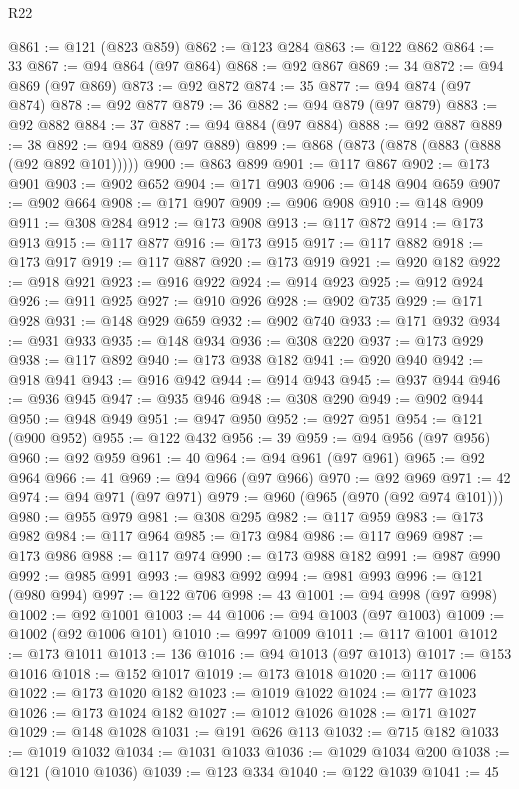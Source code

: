 \begin{lexlean}{R22}
\begin{coremodule}
@861 := @121 (@823 @859)
@862 := @123 @284
@863 := @122 @862
@864 := 33
@867 := @94 @864 (@97 @864)
@868 := @92 @867
@869 := 34
@872 := @94 @869 (@97 @869)
@873 := @92 @872
@874 := 35
@877 := @94 @874 (@97 @874)
@878 := @92 @877
@879 := 36
@882 := @94 @879 (@97 @879)
@883 := @92 @882
@884 := 37
@887 := @94 @884 (@97 @884)
@888 := @92 @887
@889 := 38
@892 := @94 @889 (@97 @889)
@899 := @868 (@873 (@878 (@883 (@888 (@92 @892 @101)))))
@900 := @863 @899
@901 := @117 @867
@902 := @173 @901
@903 := @902 @652
@904 := @171 @903
@906 := @148 @904 @659
@907 := @902 @664
@908 := @171 @907
@909 := @906 @908
@910 := @148 @909
@911 := @308 @284
@912 := @173 @908
@913 := @117 @872
@914 := @173 @913
@915 := @117 @877
@916 := @173 @915
@917 := @117 @882
@918 := @173 @917
@919 := @117 @887
@920 := @173 @919
@921 := @920 @182
@922 := @918 @921
@923 := @916 @922
@924 := @914 @923
@925 := @912 @924
@926 := @911 @925
@927 := @910 @926
@928 := @902 @735
@929 := @171 @928
@931 := @148 @929 @659
@932 := @902 @740
@933 := @171 @932
@934 := @931 @933
@935 := @148 @934
@936 := @308 @220
@937 := @173 @929
@938 := @117 @892
@940 := @173 @938 @182
@941 := @920 @940
@942 := @918 @941
@943 := @916 @942
@944 := @914 @943
@945 := @937 @944
@946 := @936 @945
@947 := @935 @946
@948 := @308 @290
@949 := @902 @944
@950 := @948 @949
@951 := @947 @950
@952 := @927 @951
@954 := @121 (@900 @952)
@955 := @122 @432
@956 := 39
@959 := @94 @956 (@97 @956)
@960 := @92 @959
@961 := 40
@964 := @94 @961 (@97 @961)
@965 := @92 @964
@966 := 41
@969 := @94 @966 (@97 @966)
@970 := @92 @969
@971 := 42
@974 := @94 @971 (@97 @971)
@979 := @960 (@965 (@970 (@92 @974 @101)))
@980 := @955 @979
@981 := @308 @295
@982 := @117 @959
@983 := @173 @982
@984 := @117 @964
@985 := @173 @984
@986 := @117 @969
@987 := @173 @986
@988 := @117 @974
@990 := @173 @988 @182
@991 := @987 @990
@992 := @985 @991
@993 := @983 @992
@994 := @981 @993
@996 := @121 (@980 @994)
@997 := @122 @706
@998 := 43
@1001 := @94 @998 (@97 @998)
@1002 := @92 @1001
@1003 := 44
@1006 := @94 @1003 (@97 @1003)
@1009 := @1002 (@92 @1006 @101)
@1010 := @997 @1009
@1011 := @117 @1001
@1012 := @173 @1011
@1013 := 136
@1016 := @94 @1013 (@97 @1013)
@1017 := @153 @1016
@1018 := @152 @1017
@1019 := @173 @1018
@1020 := @117 @1006
@1022 := @173 @1020 @182
@1023 := @1019 @1022
@1024 := @177 @1023
@1026 := @173 @1024 @182
@1027 := @1012 @1026
@1028 := @171 @1027
@1029 := @148 @1028
@1031 := @191 @626 @113
@1032 := @715 @182
@1033 := @1019 @1032
@1034 := @1031 @1033
@1036 := @1029 @1034 @200
@1038 := @121 (@1010 @1036)
@1039 := @123 @334
@1040 := @122 @1039
@1041 := 45

\end{coremodule}
\end{lexlean}
